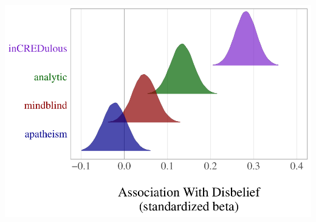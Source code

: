 \documentclass[]{article}
\begin{document}
\includegraphics{disbelief-origins-ms_files/figure-latex/posterior plot-1.pdf}
\end{document}
